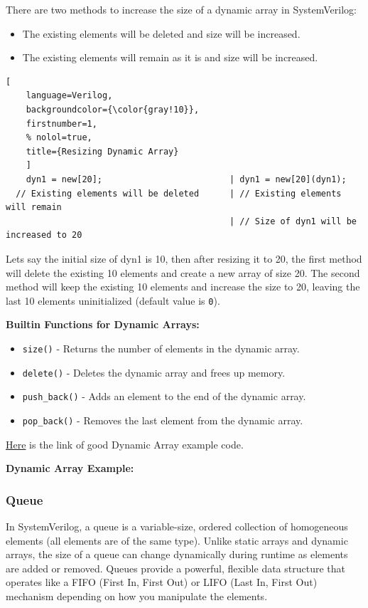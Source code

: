 \documentclass[12pt, a4paper]{article}
\begin{document}
There are two methods to increase the size of a dynamic array in SystemVerilog:
\begin{itemize}
    \item The existing elements will be deleted and size will be increased.
    \item The existing elements will remain as it is and size will be increased.
\end{itemize}

\begin{lstlisting}[
    language=Verilog,
    backgroundcolor={\color{gray!10}},
    firstnumber=1,
    % nolol=true,
    title={Resizing Dynamic Array}
    ]
    dyn1 = new[20];                         | dyn1 = new[20](dyn1);
  // Existing elements will be deleted      | // Existing elements will remain
                                            | // Size of dyn1 will be increased to 20
\end{lstlisting}

Lets say the initial size of dyn1 is 10, then after resizing it to 20, the first method will delete the existing 10 elements and create a new array of size 20. The second method will keep the existing 10 elements and increase the size to 20, leaving the last 10 elements uninitialized (default value is \texttt{0}).
\vspace{1em}

\textbf{Builtin  Functions for Dynamic Arrays:}
\begin{itemize}[nosep]
    \item \texttt{size()} - Returns the number of elements in the dynamic array.
    \item \texttt{delete()} - Deletes the dynamic array and frees up memory.
    \item \texttt{push\_back()} - Adds an element to the end of the dynamic array.
    \item \texttt{pop\_back()} - Removes the last element from the dynamic array.
\end{itemize}

\vspace{0.5em}

\href{https://vlsiverify.com/system-verilog/dynamic-array-in-sv/}{Here}
 is the link of good Dynamic Array example code.

\textbf{Dynamic Array Example:}



\subsubsection{Queue}
In SystemVerilog, a queue is a variable-size, ordered collection of homogeneous elements (all elements are of the same type). Unlike static arrays and dynamic arrays, the size of a queue can change dynamically during runtime as elements are added or removed. Queues provide a powerful, flexible data structure that operates like a FIFO (First In, First Out) or LIFO (Last In, First Out) mechanism depending on how you manipulate the elements.
\end{document}
